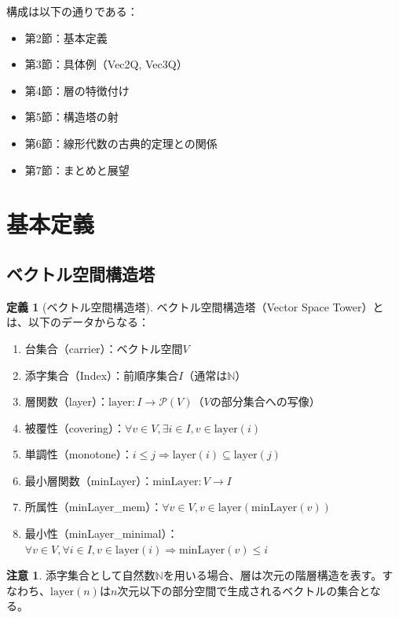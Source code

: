\documentclass[11pt,a4paper]{ltjsarticle}
\theoremstyle{definition}
\newtheorem{definition}{定義}[section]
\newtheorem{remark}{注意}[section]
\newcommand{\N}{\mathbb{N}}
\newcommand{\minLayer}{\mathrm{minLayer}}
\begin{document}
構成は以下の通りである：
\begin{itemize}
\item 第2節：基本定義
\item 第3節：具体例（Vec2Q, Vec3Q）
\item 第4節：層の特徴付け
\item 第5節：構造塔の射
\item 第6節：線形代数の古典的定理との関係
\item 第7節：まとめと展望
\end{itemize}

\section{基本定義}

\subsection{ベクトル空間構造塔}

\begin{definition}[ベクトル空間構造塔]
\label{def:vector_space_tower}
ベクトル空間構造塔（Vector Space Tower）とは、以下のデータからなる：
\begin{enumerate}
\item 台集合（carrier）：ベクトル空間$V$
\item 添字集合（Index）：前順序集合$I$（通常は$\N$）
\item 層関数（layer）：$\text{layer}: I \to \mathcal{P}(V)$（$V$の部分集合への写像）
\item 被覆性（covering）：$\forall v \in V, \exists i \in I, v \in \text{layer}(i)$
\item 単調性（monotone）：$i \leq j \Rightarrow \text{layer}(i) \subseteq \text{layer}(j)$
\item 最小層関数（minLayer）：$\minLayer: V \to I$
\item 所属性（minLayer\_mem）：$\forall v \in V, v \in \text{layer}(\minLayer(v))$
\item 最小性（minLayer\_minimal）：$\forall v \in V, \forall i \in I, v \in \text{layer}(i) \Rightarrow \minLayer(v) \leq i$
\end{enumerate}
\end{definition}

\begin{remark}
添字集合として自然数$\N$を用いる場合、層は次元の階層構造を表す。すなわち、$\text{layer}(n)$は$n$次元以下の部分空間で生成されるベクトルの集合となる。
\end{remark}
\end{document}
